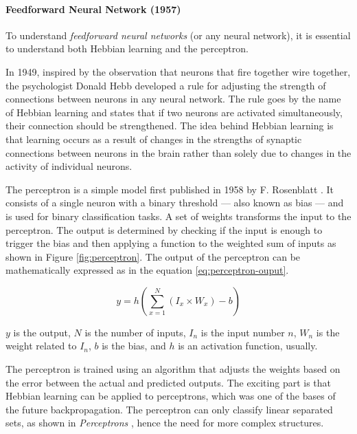 \paragraph{Feedforward Neural Network (1957)} \label{sec:feedforward}

To understand \textit{feedforward neural networks} (or any neural network), it is essential to understand both Hebbian learning and the perceptron.

In 1949, inspired by the observation that neurons that fire together wire together, the psychologist Donald Hebb \cite{hebb_organization_1949} developed a rule for adjusting the strength of connections between neurons in any neural network. The rule goes by the name of Hebbian learning and states that if two neurons are activated simultaneously, their connection should be strengthened. The idea behind Hebbian learning is that learning occurs as a result of changes in the strengths of synaptic connections between neurons in the brain rather than solely due to changes in the activity of individual neurons.

The perceptron is a simple model first published in 1958 by F. Rosenblatt \cite{rosenblatt_perceptron_1958}. It consists of a single neuron with a binary threshold --- also known as bias --- and is used for binary classification tasks. A set of weights transforms the input to the perceptron. The output is determined by checking if the input is enough to trigger the bias and then applying a function to the weighted sum of inputs as shown in Figure \ref{fig:perceptron}. The output of the perceptron can be mathematically expressed as in the equation \ref{eq:perceptron-ouput}.

\begin{equation} \label{eq:perceptron-ouput}
    y = h(\sum_{x=1}^N (I_x \times W_x) - b)
\end{equation}

$y$ is the output, $N$ is the number of inputs, $I_n$ is the input number $n$, $W_n$ is the weight related to $I_n$, $b$ is the bias, and $h$ is an activation function, usually.

The perceptron is trained using an algorithm that adjusts the weights based on the error between the actual and predicted outputs. The exciting part is that Hebbian learning can be applied to perceptrons, which was one of the bases of the future backpropagation. The perceptron can only classify linear separated sets, as shown in \textit{Perceptrons} \cite{marvin_minsky_perceptrons_1969}, hence the need for more complex structures.

